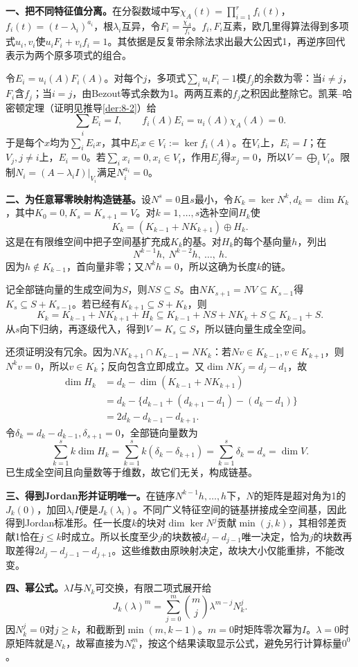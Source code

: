 \label{der:jordan-full}
\textbf{一、把不同特征值分离。}在分裂数域中写$\chi_A(t)=\prod_{i=1}^r f_i(t)$，$f_i(t)=(t-\lambda_i)^{a_i}$，根$\lambda_i$互异，令$F_i=\frac{\chi_A}{f_i}$。$f_i,F_i$互素，欧几里得算法得到多项式$u_i,v_i$使$u_iF_i+v_if_i=1$。其依据是反复带余除法求出最大公因式1，再逆序回代表示为两个原多项式的组合。

令$E_i=u_i(A)F_i(A)$。对每个$j$，多项式$\sum_i u_iF_i-1$模$f_j$的余数为零：当$i\ne j$，$F_i$含$f_j$；当$i=j$，由Bezout等式余数为1。两两互素的$f_j$之积因此整除它。凯莱--哈密顿定理（证明见推导\ref{der:8-2}）给
\[\sum_iE_i=I,\qquad f_i(A)E_i=u_i(A)\chi_A(A)=0.\]
于是每个$x$均为$\sum_i E_ix$，其中$E_ix\in V_i:=\ker f_i(A)$。在$V_i$上，$E_i=I$；在$V_j,j\ne i$上，$E_i=0$。若$\sum_i x_i=0,x_i\in V_i$，作用$E_j$得$x_j=0$，所以$V=\bigoplus_iV_i$。限制$N_i=(A-\lambda_iI)|_{V_i}$满足$N_i^{a_i}=0$。

\textbf{二、为任意幂零映射构造链基。}设$N^s=0$且$s$最小，令$K_k=\ker N^k,d_k=\dim K_k$，其中$K_0=0,K_s=K_{s+1}=V$。对$k=1,\ldots,s$选补空间$H_k$使
\[K_k=(K_{k-1}+NK_{k+1})\oplus H_k.\]
这是在有限维空间中把子空间基扩充成$K_k$的基。对$H_k$的每个基向量$h$，列出
\[N^{k-1}h,\ N^{k-2}h,\ \ldots,\ h.\]
因为$h\notin K_{k-1}$，首向量非零；又$N^kh=0$，所以这确为长度$k$的链。

记全部链向量的生成空间为$S$，则$NS\subseteq S$。由$NK_{s+1}=NV\subseteq K_{s-1}$得$K_s\subseteq S+K_{s-1}$。若已经有$K_{k+1}\subseteq S+K_k$，则
\[K_k=K_{k-1}+NK_{k+1}+H_k\subseteq K_{k-1}+NS+NK_k+S\subseteq K_{k-1}+S.\]
从$s$向下归纳，再逐级代入，得到$V=K_s\subseteq S$，所以链向量生成全空间。

还须证明没有冗余。因为$NK_{k+1}\cap K_{k-1}=NK_k$：若$Nv\in K_{k-1},v\in K_{k+1}$，则$N^kv=0$，所以$v\in K_k$；反向包含立即成立。又$\dim NK_j=d_j-d_1$，故
\[\begin{aligned}
\dim H_k&=d_k-\dim(K_{k-1}+NK_{k+1})\\
&=d_k-\{d_{k-1}+(d_{k+1}-d_1)-(d_k-d_1)\}\\
&=2d_k-d_{k-1}-d_{k+1}.
\end{aligned}\]
令$\delta_k=d_k-d_{k-1},\delta_{s+1}=0$，全部链向量数为
\[\sum_{k=1}^s k\dim H_k=\sum_{k=1}^s k(\delta_k-\delta_{k+1})=\sum_{k=1}^s\delta_k=d_s=\dim V.\]
已生成全空间且向量数等于维数，故它们无关，构成链基。

\textbf{三、得到Jordan形并证明唯一。}在链序$N^{k-1}h,\ldots,h$下，$N$的矩阵是超对角为1的$J_k(0)$，加回$\lambda_i I$便是$J_k(\lambda_i)$。不同广义特征空间的链基拼接成全空间基，因此得到Jordan标准形。任一长度$k$的块对$\dim\ker N^j$贡献$\min(j,k)$，其相邻差贡献1恰在$j\le k$时成立。所以长度至少$j$的块数被$d_j-d_{j-1}$唯一决定，恰为$j$的块数再取差得$2d_j-d_{j-1}-d_{j+1}$。这些维数由原映射决定，故块大小仅能重排，不能改变。

\textbf{四、幂公式。}$\lambda I$与$N_k$可交换，有限二项式展开给
\[J_k(\lambda)^m=\sum_{j=0}^m\binom mj\lambda^{m-j}N_k^j.
\]
因$N_k^j=0$对$j\ge k$，和截断到$\min(m,k-1)$。$m=0$时矩阵零次幂为$I$。$\lambda=0$时原矩阵就是$N_k$，故幂直接为$N_k^m$，按这个结果读取显示公式，避免另行计算标量$0^0$。
